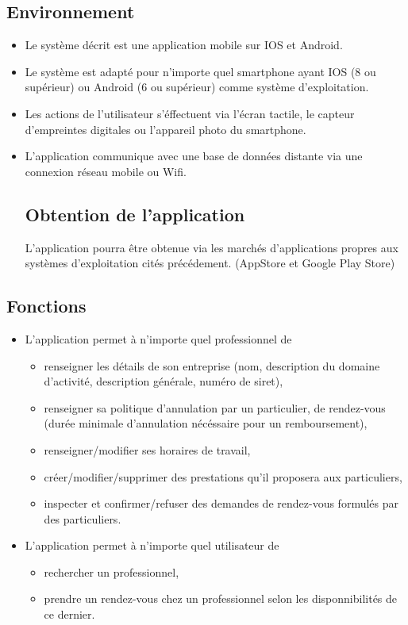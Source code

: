\documentclass{article}
\begin{document}
\subsection{Environnement}
\begin{itemize}
\item Le système décrit est une application mobile sur IOS et
Android.
\item Le système est adapté pour n'importe quel smartphone ayant IOS (8 ou supérieur) ou Android (6 ou supérieur) comme
système d'exploitation.
\item Les actions de l'utilisateur s'éffectuent via l'écran
  tactile, le capteur d'empreintes digitales ou l'appareil photo du smartphone.
\item L'application communique avec une base de données distante
  via une connexion \og réseau mobile\fg{} ou Wifi.
\subsection{Obtention de l'application}
L'application pourra être obtenue via les marchés d'applications propres aux systèmes d'exploitation cités précédement.
(AppStore et Google Play Store)

\end{itemize}
\subsection{Fonctions}
\begin{itemize}
\item L'application permet à n'importe quel professionnel de

	\begin{itemize}
	\item renseigner les détails de son entreprise (nom, description du
	domaine d'activité, description générale, numéro de siret),
	\item renseigner sa politique d'annulation par un particulier, de rendez-vous (durée minimale d'annulation nécéssaire pour un remboursement),
	\item renseigner/modifier ses horaires de travail,
	\item créer/modifier/supprimer des prestations qu'il proposera aux particuliers,
	\item inspecter et confirmer/refuser des demandes de rendez-vous formulés par des particuliers.
	\end{itemize}
\item L'application permet à n'importe quel utilisateur de

 	\begin{itemize}
	\item rechercher un professionnel,
	\item prendre un rendez-vous chez un professionnel selon les disponnibilités de
	ce dernier.
	\end{itemize}
\end{itemize}
\end{document}
